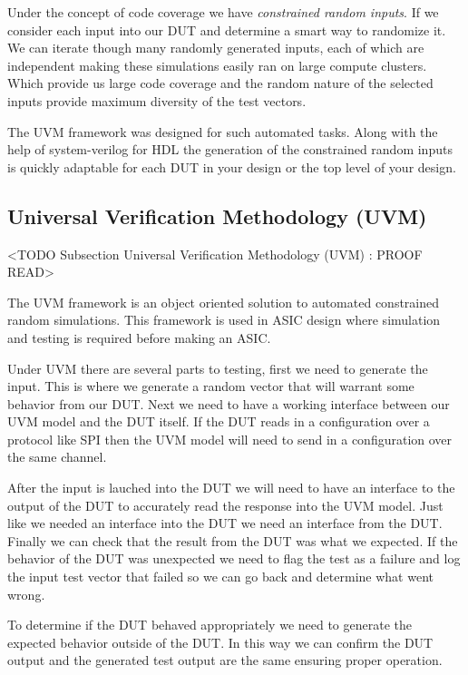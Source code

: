 Under the concept of code coverage we have \emph{constrained random inputs}. If we consider each input into our \ac{DUT} and determine a smart way to randomize it. We can iterate though many randomly generated inputs, each of which are independent making these simulations easily ran on large compute clusters. Which provide us large code coverage and the random nature of the selected inputs provide maximum diversity of the test vectors.  

The \ac{UVM} framework was designed for such automated tasks. Along with the help of system-verilog for \ac{HDL} the generation of the constrained random inputs is quickly adaptable for each \ac{DUT} in your design or the top level of your design.

\subsection{Universal Verification Methodology (UVM)}
	<TODO Subsection Universal Verification Methodology (UVM) : PROOF READ>

The \ac{UVM} framework is an object oriented solution to automated constrained random simulations. This framework is used in \ac{ASIC} design where simulation and testing is required before making an \ac{ASIC}.

Under \ac{UVM} there are several parts to testing, first we need to generate the input. This is where we generate a random vector that will warrant some behavior from our \ac{DUT}. Next we need to have a working interface between our \ac{UVM} model and the \ac{DUT} itself. If the \ac{DUT} reads in a configuration over a protocol like \ac{SPI} then the \ac{UVM} model will need to send in a configuration over the same channel. 

After the input is lauched into the \ac{DUT} we will need to have an interface to the output of the \ac{DUT} to accurately read the response into the \ac{UVM} model. Just like we needed an interface into the \ac{DUT} we need an interface from the \ac{DUT}. Finally we can check that the result from the \ac{DUT} was what we expected. If the behavior of the \ac{DUT} was unexpected we need to flag the test as a failure and log the input test vector that failed so we can go back and determine what went wrong. 

To determine if the \ac{DUT} behaved appropriately we need to generate the expected behavior outside of the \ac{DUT}. In this way we can confirm the \ac{DUT} output and the generated test output are the same ensuring proper operation.  
	
